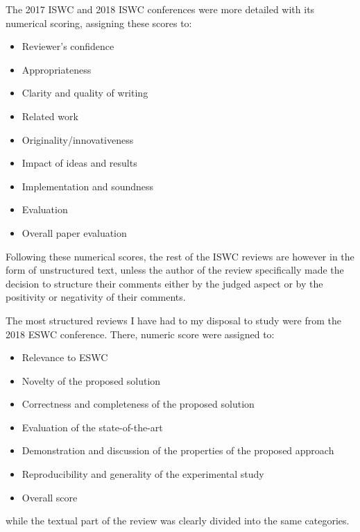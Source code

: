 The 2017 ISWC and 2018 ISWC conferences were more detailed with its numerical scoring, assigning these scores to:
\begin{itemize}
\item Reviewer's confidence
\item Appropriateness
\item Clarity and quality of writing
\item Related work
\item Originality/innovativeness
\item Impact of ideas and results
\item Implementation and soundness
\item Evaluation
\item Overall paper evaluation
\end{itemize}

Following these numerical scores, the rest of the ISWC reviews are however in the form of unstructured text, unless the author of the review specifically made the decision to structure their comments either by the judged aspect or by the positivity or negativity of their comments.

The most structured reviews I have had to my disposal to study were from the 2018 ESWC conference. There, numeric score were assigned to:
\begin{itemize}
\item Relevance to ESWC
\item Novelty of the proposed solution
\item Correctness and completeness of the proposed solution
\item Evaluation of the state-of-the-art
\item Demonstration and discussion of the properties of the proposed approach
\item Reproducibility and generality of the experimental study
\item Overall score
\end{itemize}

while the textual part of the review was clearly divided into the same categories.
